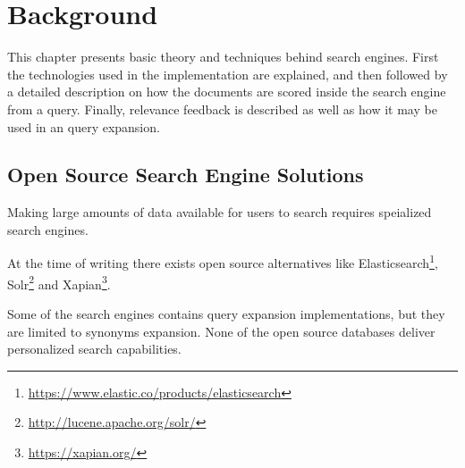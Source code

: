 \chapter{Background}
\label{ch:background}
This chapter presents basic theory and techniques behind search engines. First
the technologies used in the implementation are explained, and then followed by a
detailed description on how the documents are scored inside the search engine from a
query. Finally, relevance feedback is described as well as how it may be used in an query
expansion.

\section{Open Source Search Engine Solutions}
Making large amounts of data available for users to search requires speialized search engines.

At the time of writing there exists open source alternatives like Elasticsearch\footnote{\url{https://www.elastic.co/products/elasticsearch}},
Solr\footnote{\url{http://lucene.apache.org/solr/}} and Xapian\footnote{\url{https://xapian.org/}}.

Some of the search engines contains query expansion implementations,
but they are limited to synonyms expansion.
None of the open source databases deliver personalized search capabilities.





